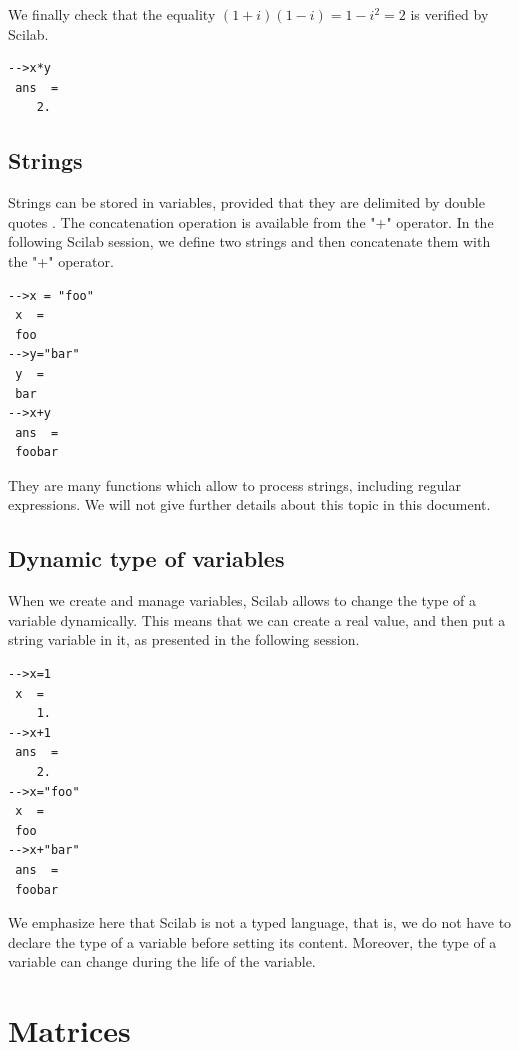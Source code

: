 We finally check that the equality $(1+i)(1-i)=1-i^2=2$
is verified by Scilab.
\lstset{language=scilabscript}
\begin{lstlisting}
-->x*y
 ans  =
    2.  
\end{lstlisting}



\subsection{Strings}

Strings can be stored in variables, provided that they are 
delimited by double quotes \scidoublequote{}. 
The concatenation operation is available from the "+" operator. 
In the following Scilab session, we define two strings and then
concatenate them with the "+" operator.
\lstset{language=scilabscript}
\begin{lstlisting}
-->x = "foo"
 x  =
 foo   
-->y="bar"
 y  =
 bar   
-->x+y
 ans  =
 foobar   
\end{lstlisting}

They are many functions which allow to process strings, including 
regular expressions. We will not give further details about this 
topic in this document.

\subsection{Dynamic type of variables}

When we create and manage variables, Scilab allows to change 
the type of a variable dynamically. This means that we can create 
a real value, and then put a string variable in it, as presented 
in the following session.
\lstset{language=scilabscript}
\begin{lstlisting}
-->x=1
 x  =
    1.  
-->x+1
 ans  =
    2.  
-->x="foo"
 x  =
 foo   
-->x+"bar"
 ans  =
 foobar   
\end{lstlisting}

We emphasize here that Scilab is not a typed language, that is, we do not have to declare 
the type of a variable before setting its content. 
Moreover, the type of a variable can change during the life 
of the variable.

\section{Matrices}

